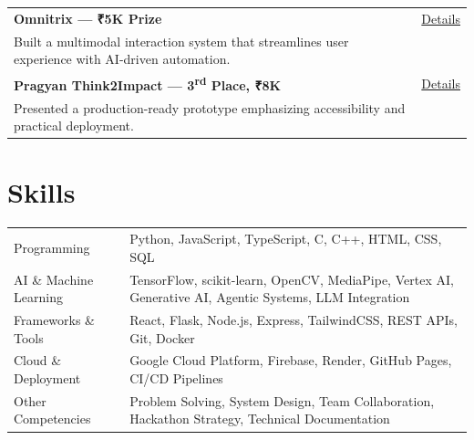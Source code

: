 \documentclass[a4paper,12pt]{article}
\begin{document}
\begin{tabularx}{\linewidth}{@{}X r@{}}
\textbf{Omnitrix — ₹5K Prize} & \href{https://www.linkedin.com/posts/vigneshbs-dev_omnitrix2025-hackathon-ai-activity-7388638930990096384-ali-}{Details} \\
Built a multimodal interaction system that streamlines user experience with AI-driven automation. & \\[6pt]

\textbf{Pragyan Think2Impact — 3\textsuperscript{rd} Place, ₹8K} & \href{https://www.linkedin.com/posts/vigneshbs-dev_pragyanideathon-winningstreak-hackathon-activity-7389708204362022912-Ojrb}{Details} \\
Presented a production-ready prototype emphasizing accessibility and practical deployment. & \\

\end{tabularx}

\section{Skills}
\begin{tabularx}{\linewidth}{@{}l X@{}}
Programming & \normalsize{Python, JavaScript, TypeScript, C, C++, HTML, CSS, SQL} \\

AI \& Machine Learning & \normalsize{TensorFlow, scikit-learn, OpenCV, MediaPipe, Vertex AI, Generative AI, Agentic Systems, LLM Integration} \\

Frameworks \& Tools & \normalsize{React, Flask, Node.js, Express, TailwindCSS, REST APIs, Git, Docker} \\

Cloud \& Deployment & \normalsize{Google Cloud Platform, Firebase, Render, GitHub Pages, CI/CD Pipelines} \\

Other Competencies & \normalsize{Problem Solving, System Design, Team Collaboration, Hackathon Strategy, Technical Documentation} \\
\end{tabularx}

\vfill
{}
\end{document}
